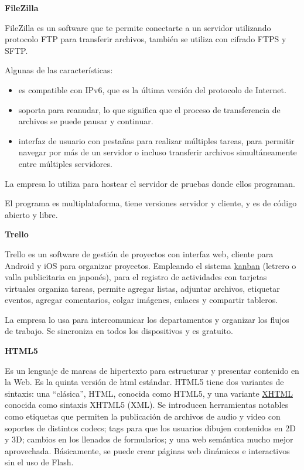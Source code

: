 \documentclass{article}
\begin{document}
\vspace{5mm}

\textbf{FileZilla}

FileZilla es un software que te permite conectarte a un servidor utilizando protocolo FTP para transferir archivos, también se utiliza con cifrado FTPS y SFTP.  

Algunas de las características:  

\begin{itemize}
\item es compatible con IPv6, que es la última versión del protocolo de Internet.
\item soporta para reanudar, lo que significa que el proceso de transferencia de archivos se puede pausar y continuar.
\item interfaz de usuario con pestañas para realizar múltiples tareas, para permitir navegar por más de un servidor o incluso transferir archivos simultáneamente entre múltiples servidores.
\end{itemize}      

La empresa lo utiliza para hostear el servidor de pruebas donde ellos programan.   

El programa es multiplataforma, tiene versiones servidor y cliente, y es de código abierto y libre.

\vspace{5mm}

\textbf{Trello}

Trello es un software de gestión de proyectos con interfaz web, cliente para Android y iOS para organizar proyectos. Empleando el sistema \href{https://es.wikipedia.org/wiki/Kanban}{kanban} (letrero o valla publicitaria en japonés), para el registro de actividades con tarjetas virtuales organiza tareas, permite agregar listas, adjuntar archivos, etiquetar eventos, agregar comentarios, colgar imágenes, enlaces y compartir tableros. 

La empresa lo usa para intercomunicar los departamentos y organizar los flujos de trabajo. Se sincroniza en todos los dispositivos y es gratuito.

\vspace{5mm}

\textbf{HTML5}

Es un lenguaje de marcas de hipertexto para estructurar y presentar contenido en la Web.  Es la quinta versión de html estándar. HTML5 tiene dos variantes de sintaxis: una “clásica”, HTML, conocida como HTML5, y una variante \href{https://es.wikipedia.org/wiki/XHTML}{XHTML} conocida como sintaxis XHTML5 (XML). Se introducen herramientas notables como etiquetas que permiten la publicación de archivos de audio y video con soportes de distintos codecs; tags para que los usuarios dibujen contenidos en 2D y 3D; cambios en los llenados de formularios; y una web semántica mucho mejor aprovechada. Básicamente, se puede crear páginas web dinámicos e interactivos sin el uso de Flash. 
\end{document}

